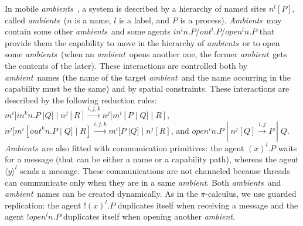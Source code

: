 \documentclass{article}
\newcommand{\ambient}{\emph{ambient}}
\newcommand{\ambients}{\emph{ambients}}
\newcommand{\Ambients}{\emph{Ambients}}
\newcommand{\concu}{|}
\begin{document}
In mobile \ambients\ \cite{ambients}, 
a system is described by a hierarchy of named sites $n^l[P]$, called \ambients\ ($n$ is a name, $l$ is a label, and $P$ is a process).
\Ambients\ may contain some other \ambients\  and some agents $\textit{in}^l n.P$/$\textit{out}^l.P$/$\textit{open}^l n.P$ that provide them the capability to move in the hierarchy of \ambients\ or to open  some \ambients\ 
 (when an \ambient\ opens another one, the former \ambient\ gets the contents of the later). These interactions are controlled both by \ambient\ names (the name of the  target \ambient\ and the name occurring in the capability must be the same) and by spatial constraints. 
These interactions are described by the following reduction rules:
 $m^i[\textit{in}^k n.P\;|Q]\;|\;n^j[R] \stackrel{\scriptscriptstyle i,j,k}{\scriptstyle \longrightarrow} n^j[ m^i[P\;|\;Q]\;|\;R]$,  $n^j[ m^i[\textit{out}^k n.P\;|\;Q]\;|\;R]\stackrel{{\scriptscriptstyle i,j,k}}{\scriptstyle \longrightarrow} m^i[P\;|Q]\;|\;n^j[R]$, and 
$\textit{open}^i n.P \;\concu\; n^j[Q] \stackrel{{\scriptscriptstyle i,j}}{\scriptstyle \longrightarrow}  P\;|\;Q$.
\Ambients\ are also fitted with communication primitives: the agent  $(x)^l.P$ waits for a message (that can be either a name or a capability path), whereas the agent $\langle y\rangle^l$ sends a message. 
These communications are not channeled because 
threads can communicate only when they are in a same \ambient.
Both \ambients\ and \ambient\ names can be created dynamically. As in the $\pi$-calculus, we use guarded replication: the agent $!(x)^l.P$ duplicates itself when receiving a message and the agent $!\textit{open}^l n.P$ duplicates itself when opening another \ambient.
\end{document}
